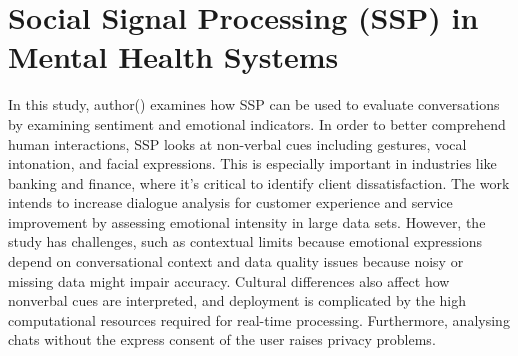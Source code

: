 \documentclass[Arial,12pt,openright,twoside]{book}
\begin{document}
\section{Social Signal Processing (SSP) in Mental Health Systems}
In this study, author(\citet{singh2019}) examines how SSP can be used to evaluate conversations by examining sentiment and emotional indicators. In order to better comprehend human interactions, SSP looks at non-verbal cues including gestures, vocal intonation, and facial expressions. This is especially important in industries like banking and finance, where it's critical to identify client dissatisfaction. The work intends to increase dialogue analysis for customer experience and service improvement by assessing emotional intensity in large data sets. However, the study has challenges, such as contextual limits because emotional expressions depend on conversational context and data quality issues because noisy or missing data might impair accuracy. Cultural differences also affect how nonverbal cues are interpreted, and deployment is complicated by the high computational resources required for real-time processing. Furthermore, analysing chats without the express consent of the user raises privacy problems. 
\end{document}
